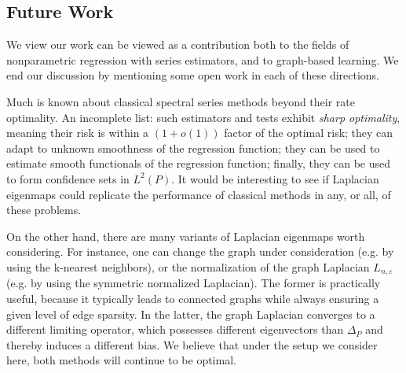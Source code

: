 \documentclass{article}
\newcommand{\1}{\mathbf{1}}
\theoremstyle{alden}
\theoremstyle{aldenthm}
\theoremstyle{definition}
\theoremstyle{remark}
\begin{document}
\subsection{Future Work}
We view our work can be viewed as a contribution both to the fields of nonparametric regression with series estimators, and to graph-based learning. We end our discussion by mentioning some open work in each of these directions. 

Much is known about classical spectral series methods beyond their rate optimality. An incomplete list: such estimators and tests exhibit \emph{sharp optimality}, meaning their risk is within a $(1 + o(1))$ factor of the optimal risk; they can adapt to unknown smoothness of the regression function; they can be used to estimate smooth functionals of the regression function;  finally, they can be used to form confidence sets in $L^2(P)$. It would be interesting to see if Laplacian eigenmaps could replicate the performance of classical methods in any, or all, of these problems.

On the other hand, there are many variants of Laplacian eigenmaps worth considering. For instance, one can change the graph under consideration (e.g. by using the k-nearest neighbors), or the normalization of the graph Laplacian $L_{n,\varepsilon}$ (e.g. by using the symmetric normalized Laplacian). The former is practically useful, because it typically leads to connected graphs while always ensuring a given level of edge sparsity. In the latter, the graph Laplacian converges to a different limiting operator, which possesses different eigenvectors than $\Delta_P$ and thereby induces a different bias. We believe that under the setup we consider here, both methods will continue to be optimal.



 

\appendix


\end{document}

